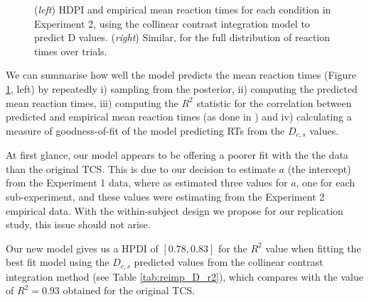 \documentclass[smallextended, natbib]{svjour3}       %
\begin{document}
\begin{figure}
\centering
{}
\caption{(\textit{left}) HDPI and empirical mean reaction times for each condition in Experiment 2, using the collinear contrast integration model to predict D values. (\textit{right}) Similar, for the full distribution of reaction times over trials. }
\label{fig:buetti2019_rt}
\end{figure}

We can summarise how well the model predicts the mean reaction times (Figure \ref{fig:buetti2019_rt}, left) by repeatedly i) sampling from the posterior, ii) computing the predicted mean reaction times, iii) computing the $R^2$ statistic for the correlation between predicted and empirical mean reaction times (as done in \citep{buetti2019predicting}) and iv) calculating a measure of goodness-of-fit of the model predicting RTs from the $D_{c,s}$ values.

At first glance, our model appears to be offering a poorer fit with the the data than the original TCS. This is due to our decision to estimate $a$ (the intercept) from the Experiment 1 data, where as \cite{buetti2019predicting} estimated three values for $a$, one for each sub-experiment, and these values were estimating from the Experiment 2 empirical data. With the within-subject design we propose for our replication study, this issue should not arise.

Our new model gives us a HPDI of $[0.78, 0.83]$ for the $R^2$ value when fitting the best fit model using the $D_{c,s}$ predicted values from the collinear contrast integration method (see Table \ref{tab:reimp_D_r2}), which compares with the value of $R^2 = 0.93$ obtained for the original TCS.  
\end{document}
